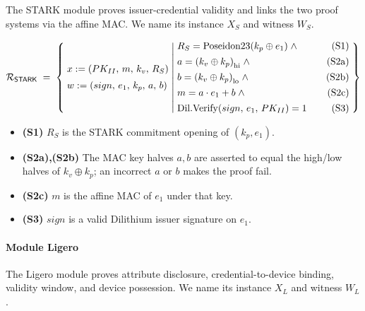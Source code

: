 \documentclass[binding=0.6cm,oneside,noexaminfo]{sapthesis}
\newcommand{\hipart}[1]{{#1}_{\mathrm{hi}}}
\newcommand{\lopart}[1]{{#1}_{\mathrm{lo}}}
\newcommand{\Poseidon}{\mathrm{Poseidon23}}
\newcommand{\DilVerify}{\mathrm{Dil.Verify}}
\newcommand{\Rel}[1]{\mathcal{R}_{#1}}
\newcommand{\RelSTARK}{\Rel{\mathsf{STARK}}}
\begin{document}
The STARK module proves issuer-credential validity and links the two proof
systems via the affine MAC. We name its instance $X_S$ and witness $W_S$.

\begin{mdframed}[style=relationbox]
{\small
\[
\RelSTARK \;=\; \left\{\;
\begin{array}{@{}l@{}}
x := (PK_{II},\, m,\, k_v,\, R_S) \\[5pt]
w := (sign,\, e_1,\, k_p,\, a,\, b)
\end{array}
\;\middle|\;
\begin{array}{@{}l@{\qquad}r@{}}
R_S = \Poseidon(k_p \oplus e_1) \;\wedge & \text{(S1)} \\[4pt]
a = \hipart{(k_v \oplus k_p)} \;\wedge & \text{(S2a)} \\[4pt]
b = \lopart{(k_v \oplus k_p)} \;\wedge & \text{(S2b)} \\[4pt]
m = a \cdot e_1 + b \;\wedge & \text{(S2c)} \\[4pt]
\DilVerify(sign,\, e_1,\, PK_{II}) = 1 & \text{(S3)}
\end{array}
\;\right\}
\]
}
\end{mdframed}

\begin{itemize}[leftmargin=2em, itemsep=2pt]
  \item \textbf{(S1)} $R_S$ is the STARK commitment opening of $(k_p, e_1)$.
  \item \textbf{(S2a),(S2b)} The MAC key halves $a,b$ are asserted to equal
        the high/low halves of $k_v \oplus k_p$; an incorrect $a$ or $b$
        makes the proof fail.
  \item \textbf{(S2c)} $m$ is the affine MAC of $e_1$ under that key.
  \item \textbf{(S3)} $sign$ is a valid Dilithium issuer signature on $e_1$.
\end{itemize}

\paragraph{Module \textsf{Ligero}}
\label{sec:ligero}

The Ligero module proves attribute disclosure, credential-to-device binding,
validity window, and device possession. We name its instance $X_L$ and
witness $W_L$.
\end{document}
